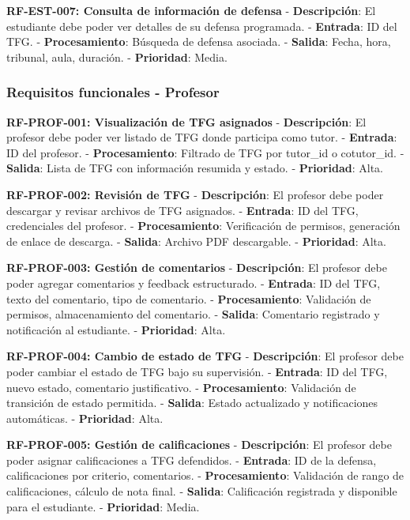 \documentclass[12pt,a4paper,oneside]{report}
\begin{document}
\textbf{RF-EST-007: Consulta de información de defensa} -
\textbf{Descripción}: El estudiante debe poder ver detalles de su
defensa programada. - \textbf{Entrada}: ID del TFG. -
\textbf{Procesamiento}: Búsqueda de defensa asociada. - \textbf{Salida}:
Fecha, hora, tribunal, aula, duración. - \textbf{Prioridad}: Media.

\subsubsection{Requisitos funcionales -
Profesor}\label{requisitos-funcionales---profesor}

\textbf{RF-PROF-001: Visualización de TFG asignados} -
\textbf{Descripción}: El profesor debe poder ver listado de TFG donde
participa como tutor. - \textbf{Entrada}: ID del profesor. -
\textbf{Procesamiento}: Filtrado de TFG por tutor\_id o cotutor\_id. -
\textbf{Salida}: Lista de TFG con información resumida y estado. -
\textbf{Prioridad}: Alta.

\textbf{RF-PROF-002: Revisión de TFG} - \textbf{Descripción}: El
profesor debe poder descargar y revisar archivos de TFG asignados. -
\textbf{Entrada}: ID del TFG, credenciales del profesor. -
\textbf{Procesamiento}: Verificación de permisos, generación de enlace
de descarga. - \textbf{Salida}: Archivo PDF descargable. -
\textbf{Prioridad}: Alta.

\textbf{RF-PROF-003: Gestión de comentarios} - \textbf{Descripción}: El
profesor debe poder agregar comentarios y feedback estructurado. -
\textbf{Entrada}: ID del TFG, texto del comentario, tipo de comentario.
- \textbf{Procesamiento}: Validación de permisos, almacenamiento del
comentario. - \textbf{Salida}: Comentario registrado y notificación al
estudiante. - \textbf{Prioridad}: Alta.

\textbf{RF-PROF-004: Cambio de estado de TFG} - \textbf{Descripción}: El
profesor debe poder cambiar el estado de TFG bajo su supervisión. -
\textbf{Entrada}: ID del TFG, nuevo estado, comentario justificativo. -
\textbf{Procesamiento}: Validación de transición de estado permitida. -
\textbf{Salida}: Estado actualizado y notificaciones automáticas. -
\textbf{Prioridad}: Alta.

\textbf{RF-PROF-005: Gestión de calificaciones} - \textbf{Descripción}:
El profesor debe poder asignar calificaciones a TFG defendidos. -
\textbf{Entrada}: ID de la defensa, calificaciones por criterio,
comentarios. - \textbf{Procesamiento}: Validación de rango de
calificaciones, cálculo de nota final. - \textbf{Salida}: Calificación
registrada y disponible para el estudiante. - \textbf{Prioridad}: Media.
\end{document}
